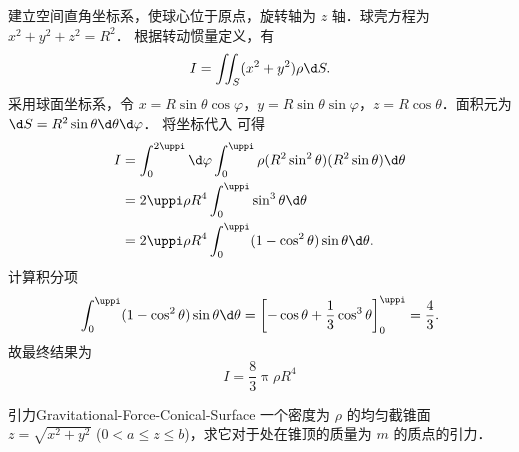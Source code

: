 \begin{solution}
    建立空间直角坐标系，使球心位于原点，旋转轴为 $z$ 轴．球壳方程为 $x^2 + y^2 + z^2 = R^2$．
    根据转动惯量定义，有
    \begin{equation}
        \label{eq:Inertia-Def-1}
        I = \iint_{S} (x^2 + y^2) \rho \d S.
    \end{equation}
    采用球面坐标系，令 $x = R \sin \theta \cos \varphi$，$y = R \sin \theta \sin \varphi$，$z = R \cos \theta$．面积元为 $\d S = R^2 \sin \theta \d \theta \d \varphi$．
    将坐标代入  可得
    \begin{equation}
        \begin{aligned}
            I & = \int_{0}^{2\uppi} \d \varphi \int_{0}^{\uppi} \rho (R^2 \sin^2 \theta) (R^2 \sin \theta) \d \theta \\
              & = 2\uppi \rho R^4 \int_{0}^{\uppi} \sin^3 \theta \d \theta                                           \\
              & = 2\uppi \rho R^4 \int_{0}^{\uppi} (1 - \cos^2 \theta) \sin \theta \d \theta.
        \end{aligned}
    \end{equation}
    计算积分项
    \begin{equation}
        \int_{0}^{\uppi} (1 - \cos^2 \theta) \sin \theta \d \theta = \left[ -\cos \theta + \frac{1}{3} \cos^3 \theta \right]_{0}^{\uppi} = \frac{4}{3}.
    \end{equation}
    故最终结果为
    \begin{equation}
        I = \boxed{\frac{8}{3} \uppi \rho R^4}
    \end{equation}
\end{solution}

\begin{problem}{引力}{Gravitational-Force-Conical-Surface}
    一个密度为 $\rho$ 的均匀截锥面 $z = \sqrt{x^2 + y^2}$ ($0 < a \leqslant z \leqslant b$)，求它对于处在锥顶的质量为 $m$ 的质点的引力．
\end{problem}

